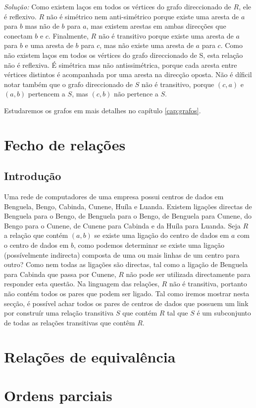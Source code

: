 \emph{Solução:} Como existem laços em todos os vértices do grafo direccionado
de $R$, ele é reflexivo. $R$ não é simétrico nem anti-simétrico porque existe
uma aresta de $a$ para $b$ mas não de $b$ para $a$, mas existem arestas em
ambas direcções que conectam $b$ e $c$. Finalmente, $R$ não é transitivo porque
existe uma aresta de $a$ para $b$ e uma aresta de $b$ para $c$, mas não existe
uma aresta de $a$ para $c$. Como não existem laços em todos os vértices do grafo
direccionado de S, esta relação não é reflexiva. É simétrica mas não
antissimétrica, porque cada aresta entre vértices distintos é acompanhada por
uma aresta na direcção oposta. Não é díficil notar também que o grafo
direccionado de $S$ não é transitivo, porque $(c,a)$ e $(a,b)$ pertencem a $S$,
mas $(c,b)$ não pertence a $S$.

Estudaremos os grafos em mais detalhes no capítulo \ref{cap:grafos}.


\section{Fecho de relações}

\subsection{Introdução}

Uma rede de computadores de uma empresa possui centros de dados em Benguela,
Bengo, Cabinda, Cunene, Huíla e Luanda.
Existem ligações directas de Benguela para o Bengo, de Benguela para o Bengo,
de Benguela para Cunene, do Bengo para o Cunene, de Cunene para Cabinda e da
Huíla para Luanda. Seja $R$ a relação que contém $(a,b)$ se existe uma ligação
do centro de dados em $a$ com o centro de dados em $b$, como podemos determinar
se existe uma ligação (possívelmente indirecta) composta de uma ou mais linhas
de um centro para outro? Como nem todas as ligações são directas, tal como a
ligação de Benguela para Cabinda que passa por Cunene, $R$ não pode ser
utilizada directamente para responder esta questão.
Na linguagem das relações, $R$ não é transitiva, portanto não contém todos os
pares que podem ser ligado. Tal como iremos mostrar nesta secção, é possível
achar todos os pares de centros de dados que possuem um link por construír uma
relação transitiva $S$ que contém $R$ tal que $S$ é um subconjunto de todas as
relações transitivas que contêm $R$.


\section{Relações de equivalência}

\section{Ordens parciais}